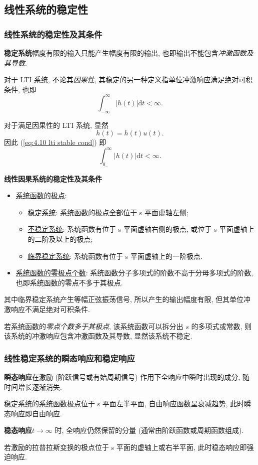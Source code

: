 \subsection{线性系统的稳定性} \label{4 线性系统的稳定性}
\subsubsection{线性系统的稳定性及其条件}
\textbf{稳定系统}\quad 幅度有限的输入只能产生幅度有限的输出, 也即输出不能包含\textit{冲激函数及其导数}.

对于 LTI 系统, 不论其\textit{因果性}, 其稳定的另一种定义指单位冲激响应满足绝对可积条件, 也即
\begin{equation} \label{eq:4.10 lti stable cond}
    \int_{-\infty}^{\infty}|h(t)|\mathrm{d}t<\infty.
\end{equation}

对于满足因果性的 LTI 系统, 显然
\begin{equation}
    h(t)=h(t)u(t).
\end{equation}
因此 (\ref{eq:4.10 lti stable cond}) 即
\begin{equation}
    \int_{0_-}^{\infty}|h(t)|\mathrm{d}t<\infty.
\end{equation}

\textbf{线性因果系统的稳定性及其条件}
\begin{itemize}
    \item \underline{系统函数的极点}:
          \begin{itemize}
              \item \underline{稳定系统}: 系统函数的极点全部位于 s 平面虚轴左侧;
              \item \underline{不稳定系统}: 系统函数有位于 s 平面虚轴右侧的极点, 或位于 s 平面虚轴上的二阶及以上的极点;
              \item \underline{临界稳定系统}: 系统函数有位于 s 平面虚轴上的一阶极点.
          \end{itemize}
    \item \underline{系统函数的零极点个数}: 系统函数分子多项式的阶数不高于分母多项式的阶数, 也即系统函数的零点不多于其极点.
\end{itemize}

其中临界稳定系统产生等幅正弦振荡信号, 所以产生的输出幅度有限, 但其单位冲激响应不满足绝对可积条件.

若系统函数的\textit{零点个数多于其极点}, 该系统函数可以拆分出 $s$ 的多项式或常数, 则该系统的冲激响应包含冲激函数及其导数, 显然该系统不稳定.

\subsubsection{线性稳定系统的瞬态响应和稳定响应} \label{4.10 线性稳定系统的瞬态响应和稳定响应}
\textbf{瞬态响应}\quad 在激励 (阶跃信号或有始周期信号) 作用下全响应中瞬时出现的成分, 随时间增长逐渐消失.

稳定系统的系统函数极点位于 s 平面左半平面, 自由响应函数呈衰减趋势, 此时瞬态响应即自由响应.

\textbf{稳态响应}\quad $t\rightarrow\infty$ 时, 全响应仍然保留的分量 (通常由阶跃函数或周期函数组成).

若激励的拉普拉斯变换的极点位于 s 平面的虚轴上或右半平面, 此时稳态响应即强迫响应.
